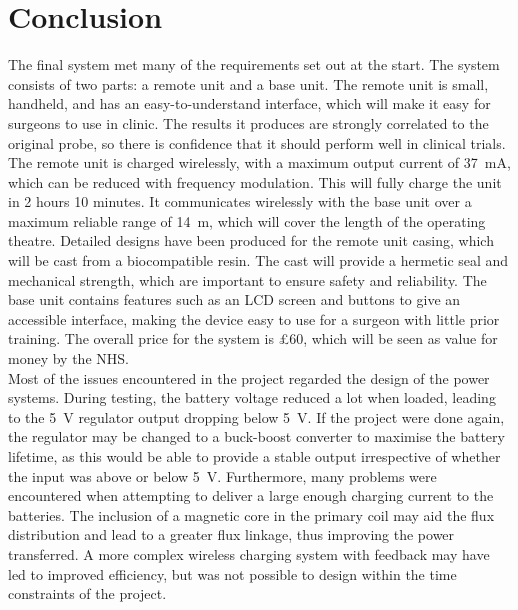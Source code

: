\section{Conclusion}
The final system met many of the requirements set out at the start. The system consists of two parts: a remote unit and a base unit. The remote unit is small, handheld, and has an easy-to-understand interface, which will make it easy for surgeons to use in clinic. The results it produces are strongly correlated to the original probe, so there is confidence that it should perform well in clinical trials. The remote unit is charged wirelessly, with a maximum output current of \SI{37}{\milli\ampere}, which can be reduced with frequency modulation. This will fully charge the unit in 2 hours 10 minutes. It communicates wirelessly with the base unit over a maximum reliable range of \SI{14}{\metre}, which will cover the length of the operating theatre. Detailed designs have been produced for the remote unit casing, which will be cast from a biocompatible resin. The cast will provide a hermetic seal and mechanical strength, which are important to ensure safety and reliability. The base unit contains features such as an LCD screen and buttons to give an accessible interface, making the device easy to use for a surgeon with little prior training. The overall price for the system is £60, which will be seen as value for money by the NHS. \\


Most of the issues encountered in the project regarded the design of the power systems. During testing, the battery voltage reduced a lot when loaded, leading to the \SI{5}{\volt} regulator output dropping below \SI{5}{\volt}. If the project were done again, the regulator may be changed to a buck-boost converter to maximise the battery lifetime, as this would be able to provide a stable output irrespective of whether the input was above or below \SI{5}{\volt}. Furthermore, many problems were encountered when attempting to deliver a large enough charging current to the batteries. The inclusion of a magnetic core in the primary coil may aid the flux distribution and lead to a greater flux linkage, thus improving the power transferred. A more complex wireless charging system with feedback may have led to improved efficiency, but was not possible to design within the time constraints of the project.\\

